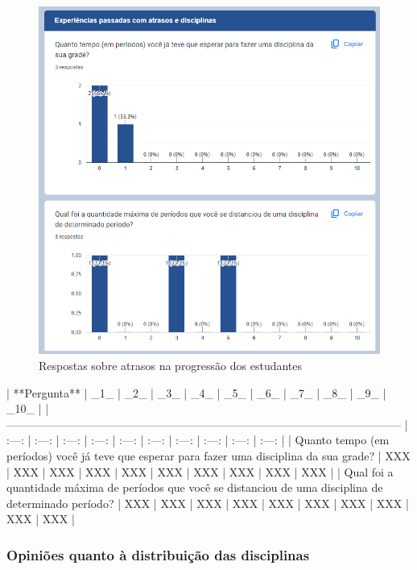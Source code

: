        \begin{figure}[htbp]\centering
            \caption{\label{fig:4_Atrasos} Respostas sobre atrasos na progressão dos estudantes}
            \includegraphics[scale=0.8]{files/img/forms/4.0-Atrasos.png}
        \end{figure} %

        | **Pergunta**                                                                                              |  _1_  |  _2_  |  _3_  |  _4_  |  _5_  |  _6_  |  _7_  |  _8_  |  _9_  | _10_  |
        | --------------------------------------------------------------------------------------------------------- | :---: | :---: | :---: | :---: | :---: | :---: | :---: | :---: | :---: | :---: |
        | Quanto tempo (em períodos) você já teve que esperar para fazer uma disciplina da sua grade?               |  XXX  |  XXX  |  XXX  |  XXX  |  XXX  |  XXX  |  XXX  |  XXX  |  XXX  |  XXX  |
        | Qual foi a quantidade máxima de períodos que você se distanciou de uma disciplina de determinado período? |  XXX  |  XXX  |  XXX  |  XXX  |  XXX  |  XXX  |  XXX  |  XXX  |  XXX  |  XXX  |

    \subsubsection{Opiniões quanto à distribuição das disciplinas} %

